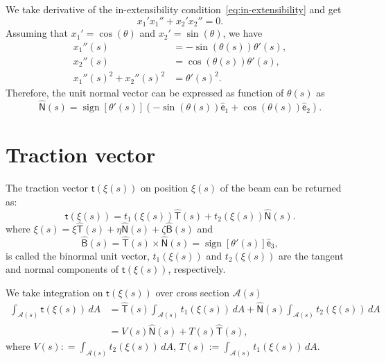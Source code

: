 \documentclass{article}
\newcommand{\bsf}[1]{\boldsymbol{\mathsf{#1}}}
\newcommand{\hb}[1]{\hat{\bsf{#1}}}
\DeclareMathOperator{\sign}{sign}
\begin{document}
We take derivative of the in-extensibility condition~\eqref{eq:in-extensibility} and get
\begin{equation}
x_1' x_1'' + x_2' x_2'' = 0.
\end{equation}
Assuming that $x_1' = \cos(\theta)$ and $x_2' = \sin(\theta)$, we have
\begin{align}
x_1''(s) &= -\sin(\theta(s)) \theta'(s),\\
x_2''(s) &= \cos(\theta(s)) \theta'(s),\\
x_1''(s)^2 + x_2''(s)^2 &=  \theta'(s)^2 .
\end{align}
Therefore, the unit normal vector can be expressed as function of $\theta(s)$ as
\begin{equation}
\label{eq:NUnit}
\hat{\bsf{N}}(s)  = \sign\left[\theta'(s)\right] \left(-\sin(\theta(s))\hb{e}_1 + \cos(\theta(s))\hb{e}_2 \right).
\end{equation}

\section{Traction vector}

The traction vector $\bsf{t} (\bsf{\xi} (s))$ on position $\bsf{\xi} (s)$ of the beam can be returned as:
\begin{equation}
\bsf{t} (\bsf{\xi}(s)) = t_1 (\bsf{\xi}(s)) \hat{\bsf{T}}(s) + t_2 (\bsf{\xi}(s)) \hat{\bsf{N}}(s).
\end{equation}
where $\bsf{\xi} (s) = \xi \hat{\bsf{T}}(s) + \eta \hat{\bsf{N}}(s) + \zeta \hat{\bsf{B}}(s)$ and 
\begin{equation}
\hat{\bsf{B}}(s) = \hat{\bsf{T}}(s) \times \hat{\bsf{N}} (s) = \sign\left[\theta'(s)\right] \hb{e}_3,
\end{equation}
is called the binormal unit vector, $t_1(\bsf{\xi}(s))$ and $t_2(\bsf{\xi}(s))$ are the tangent and normal components of $\bsf{t} (\bsf{\xi}(s)) $, respectively.

We take integration on $\bsf{t} (\bsf{\xi}(s))  $ over cross section $\mathcal{A}(s)$
\begin{align}
\int_{\mathcal{A}(s)}  \bsf{t} (\bsf{\xi}(s)) \, dA  &
= \hat{\bsf{T}}(s) \int_{\mathcal{A}(s)} t_1 (\bsf{\xi}(s)) \, dA  
+ \hat{\bsf{N}}(s) \int_{\mathcal{A}(s)} t_2 (\bsf{\xi}(s)) \, dA  \\ &  
= V(s) \hat{\bsf{N}}(s)  +  T(s) \hat{\bsf{T}}(s),
\end{align}
where $V(s): = \int_{\mathcal{A}(s)}  t_2 (\bsf{\xi}(s)) \, dA $, $T(s) := \int_{\mathcal{A}(s)}  t_1 (\bsf{\xi}(s)) \, dA$. 
\end{document}
